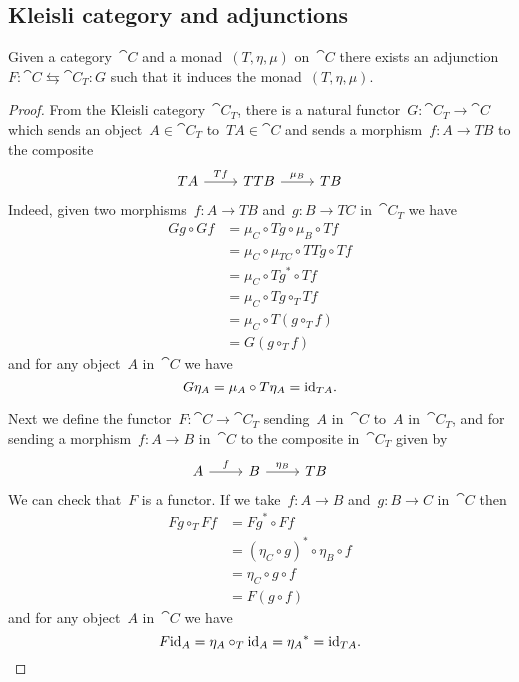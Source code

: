 \documentclass[../TFG.tex]{subfiles}
\begin{document}
\subsection{Kleisli category and adjunctions}
\begin{theorem}
    Given a category~\(\cat{C}\) and a monad~\((T,\eta,\mu)\) on~\(\cat{C}\)
    there exists an adjunction~\(F:\cat{C}\leftrightarrows\cat{C}_{T}:G\)
    such that it induces the monad~\((T,\eta,\mu)\).
\end{theorem}
\begin{proof}
    From the Kleisli category~\(\cat{C}_{T}\), there is a natural
    functor~\(G:\cat{C}_{T}\longrightarrow\cat{C}\) which sends an
    object~\(A\in\cat{C}_{T}\) to~\(TA\in\cat{C}\) and sends a
    morphism~\(f:A\longrightarrow TB\) to the composite
    \[\begin{tikzcd}
        TA \ar[r, "Tf"] & TTB \ar[r, "\mu_{B}"] & TB
    \end{tikzcd}\]
    Indeed, given two morphisms~\(f:A\longrightarrow TB\)
    and~\(g:B\longrightarrow TC\) in~\(\cat{C}_{T}\) we have
    \begin{align*}
        Gg \circ Gf
            &= \mu_{C} \circ Tg \circ \mu_{B} \circ Tf \\
            &= \mu_{C} \circ \mu_{TC} \circ TTg \circ Tf \\
            &= \mu_{C} \circ Tg^{\ast} \circ Tf \\
            &= \mu_{C} \circ Tg \circ_{T} Tf \\
            &= \mu_{C} \circ T(g \circ_{T} f) \\
            &= G(g \circ_{T} f)
    \end{align*}
    and for any object~\(A\) in~\(\cat{C}\) we have
    \[
        G\eta_{A} = \mu_{A} \circ T\eta_{A} = \mathrm{id}_{TA}.
    \]

    Next we define the functor~\(F:\cat{C}\longrightarrow\cat{C}_{T}\)
    sending~\(A\) in~\(\cat{C}\) to~\(A\) in~\(\cat{C}_{T}\), and for sending a
    morphism~\(f:A\longrightarrow B\) in~\(\cat{C}\) to the composite
    in~\(\cat{C}_{T}\) given by
    \[\begin{tikzcd}
        A \ar[r, "f"] & B \ar[r, "\eta_{B}"] & TB
    \end{tikzcd}\]
    We can check that~\(F\) is a functor. If we take~\(f:A\longrightarrow B\)
    and~\(g:B\longrightarrow C\) in~\(\cat{C}\) then
    \begin{align*}
        Fg \circ_{T} Ff
            &= {Fg}^{\ast} \circ Ff \\
            &= (\eta_{C} \circ g)^{\ast} \circ \eta_{B} \circ f \\
            &= \eta_{C} \circ g \circ f \\
            &= F(g \circ f)
    \end{align*}
    and for any object~\(A\) in~\(\cat{C}\) we have
    \[
        F\mathrm{id}_{A} = \eta_{A} \circ_{T} \mathrm{id}_{A} = {\eta_{A}}^{\ast} = \mathrm{id}_{TA}.
    \]


\end{proof}
\end{document}
